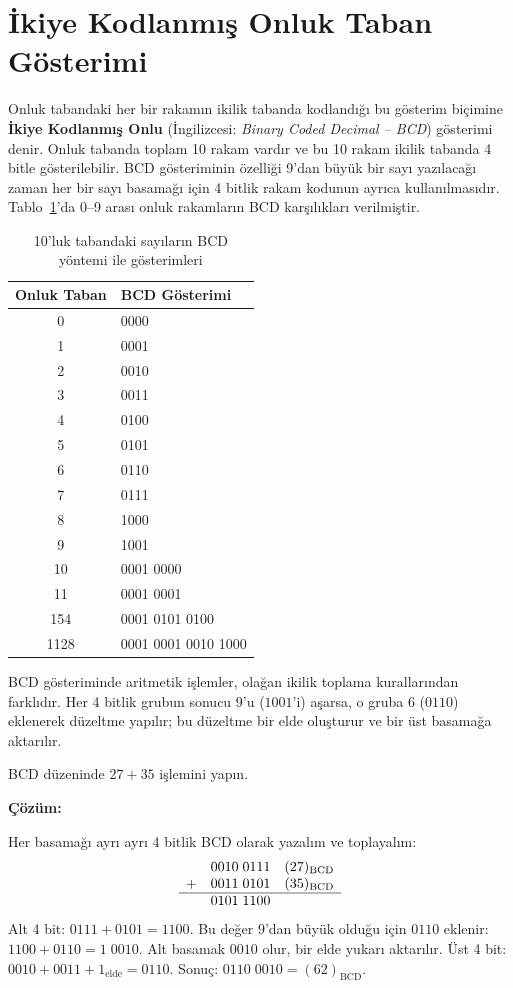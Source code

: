 \section{İkiye Kodlanmış Onluk Taban Gösterimi}
\label{sec:bcd}

Onluk tabandaki her bir rakamın ikilik tabanda kodlandığı bu gösterim biçimine \textbf{İkiye Kodlanmış Onlu} (İngilizcesi: \textit{Binary Coded Decimal -- BCD}) gösterimi denir. Onluk tabanda toplam 10 rakam vardır ve bu 10 rakam ikilik tabanda 4 bitle gösterilebilir. BCD gösteriminin özelliği 9'dan büyük bir sayı yazılacağı zaman her bir sayı basamağı için 4 bitlik rakam kodunun ayrıca kullanılmasıdır. Tablo~\ref{tab:bcd-tablo}'da 0--9 arası onluk rakamların BCD karşılıkları verilmiştir.

\begin{table}[H]
\centering
\caption{10'luk tabandaki sayıların BCD yöntemi ile gösterimleri}
\label{tab:bcd-tablo}
\begin{tabular}{cl}
\toprule
\textbf{Onluk Taban} & \textbf{BCD Gösterimi} \\
\midrule
0    & 0000 \\
1    & 0001 \\
2    & 0010 \\
3    & 0011 \\
4    & 0100 \\
5    & 0101 \\
6    & 0110 \\
7    & 0111 \\
8    & 1000 \\
9    & 1001 \\
10   & 0001 0000 \\
11   & 0001 0001 \\
154  & 0001 0101 0100 \\
1128 & 0001 0001 0010 1000 \\
\bottomrule
\end{tabular}
\end{table}

BCD gösteriminde aritmetik işlemler, olağan ikilik toplama kurallarından farklıdır. Her 4 bitlik grubun sonucu 9'u ($1001$'i) aşarsa, o gruba 6 ($0110$) eklenerek düzeltme yapılır; bu düzeltme bir elde oluşturur ve bir üst basamağa aktarılır.

\begin{ornek}[A.22]
BCD düzeninde $27 + 35$ işlemini yapın.

\textbf{Çözüm:}

Her basamağı ayrı ayrı 4 bitlik BCD olarak yazalım ve toplayalım:
\[
\begin{array}{rcl}
  & 0010\;0111 & (27)_{\text{BCD}} \\
+ & 0011\;0101 & (35)_{\text{BCD}} \\
\hline
  & 0101\;1100 &
\end{array}
\]
Alt 4 bit: $0111 + 0101 = 1100$. Bu değer $9$'dan büyük olduğu için $0110$ eklenir: $1100 + 0110 = 1\;0010$. Alt basamak $0010$ olur, bir elde yukarı aktarılır. Üst 4 bit: $0010 + 0011 + 1_{\text{elde}} = 0110$. Sonuç: $0110\;0010 = (62)_{\text{BCD}}$.
\end{ornek}


